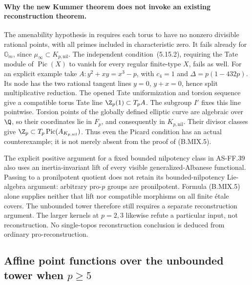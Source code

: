 \paragraph{Why the new Kummer theorem does not invoke an existing reconstruction theorem.}
The amenability hypothesis in
\citep[Definition~5.15(5.15.1)]{CarlsonHaineWolf2024}
requires each torus to have no nonzero divisible rational
points, with all primes included in characteristic zero.
It fails already for \(\mathbb G_m\), since
\(\mu_\infty\subset K_{p,\mathrm{nil}}\).
The independent condition~(5.15.2), requiring the Tate module
of \(\operatorname{Pic}(X)\) to vanish for every regular
finite-type \(X\), fails as well. For an explicit example take
\(A:y^2+xy=x^3-p\), with \(c_4=1\) and
\(\Delta=p(1-432p)\). Its node has the two rational tangent
lines \(y=0\), \(y+x=0\), hence split multiplicative reduction.
The opened Tate uniformization and torsion sequence
\citep[Theorem~1, author p.~6; pp.~18--19]{Tate1995}
give a compatible torus Tate line \(\Z_p(1)\subset T_pA\).
The subgroup \(I'\) fixes this line pointwise. Torsion points
of the globally defined elliptic curve are algebraic over
\(\Q\), so their coordinates lie in \(F_p\), and consequently
in \(K_{p,\mathrm{nil}}\). Their divisor classes give
\(\Z_p\subset T_p\operatorname{Pic}(A_{K_{p,\mathrm{nil}}})\).
Thus even the Picard condition has an actual counterexample;
it is not merely absent from the proof of (B.MIX.5).

The explicit positive argument for a fixed bounded nilpotency
class in AS-FF.39 also uses an inertia-invariant lift of every
visible generalized-Albanese functional. Passing to a
pronilpotent quotient does not retain its bounded-nilpotency
Lie-algebra argument: arbitrary pro-\(p\) groups are
pronilpotent. Formula (B.MIX.5) alone supplies neither that
lift nor compatible morphisms on all finite étale covers.
The unbounded tower therefore still requires a separate
reconstruction argument. The larger kernels at \(p=2,3\)
likewise refute a particular input, not reconstruction.
No single-topos reconstruction conclusion is deduced from
ordinary pro-reconstruction.

\subsection{Affine point functions over the unbounded tower when \texorpdfstring{\(p\geq5\)}{p >= 5}}

